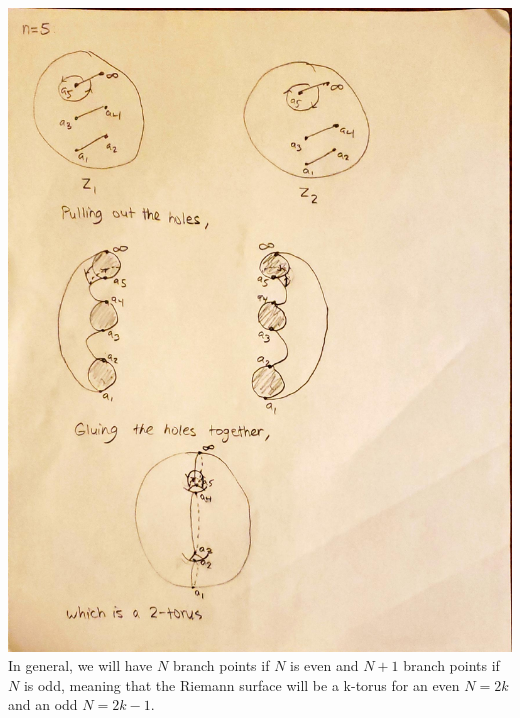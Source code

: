 \documentclass{article}
\begin{document}
\includegraphics[scale=0.4]{567hw3fig2.pdf}\\
In general, we will have $N$ branch points if $N$ is even and $N+1$ branch points if $N$ is odd, meaning that the Riemann surface will be a k-torus for an even $N=2k$ and an odd $N=2k-1$.
\end{document}
